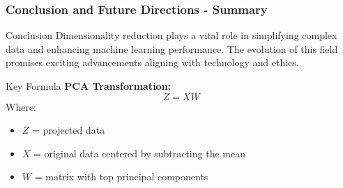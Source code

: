 \documentclass[aspectratio=169]{beamer}
\begin{document}
\begin{frame}[fragile]
  \frametitle{Conclusion and Future Directions - Summary}
  \begin{block}{Conclusion}
    Dimensionality reduction plays a vital role in simplifying complex data and enhancing machine learning performance. The evolution of this field promises exciting advancements aligning with technology and ethics.
  \end{block}

  \begin{block}{Key Formula}
    \textbf{PCA Transformation:} 
    \begin{equation}
      Z = XW
    \end{equation}
    Where:
    \begin{itemize}
      \item \( Z \) = projected data
      \item \( X \) = original data centered by subtracting the mean
      \item \( W \) = matrix with top principal components
    \end{itemize}
  \end{block}
\end{frame}
\end{document}
